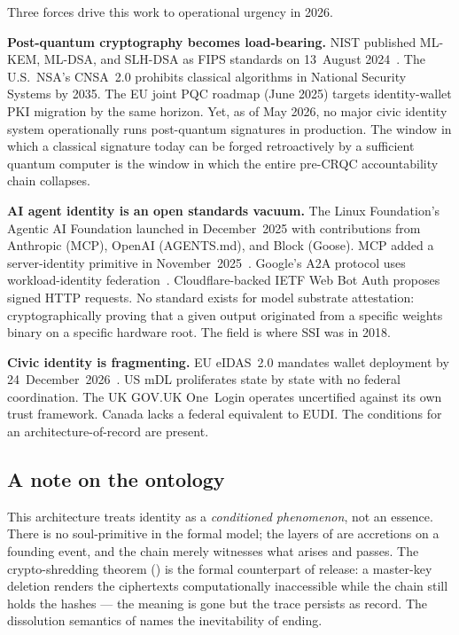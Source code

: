\documentclass[11pt,a4paper,parskip=half-,DIV=12,headings=standardclasses]{scrartcl}
\theoremstyle{ncthm}
\theoremstyle{ncdef}
\begin{document}
Three forces drive this work to operational urgency in 2026.

\textbf{Post-quantum cryptography becomes load-bearing.} NIST published
ML-KEM, ML-DSA, and SLH-DSA as FIPS standards on 13~August
2024~\cite{nist-fips-203,nist-fips-204,nist-fips-205}. The U.S.\ NSA's
CNSA~2.0 prohibits classical algorithms in National Security Systems
by 2035. The EU joint PQC roadmap (June 2025) targets identity-wallet
PKI migration by the same horizon. Yet, as of May 2026, no major civic
identity system operationally runs post-quantum signatures in
production. The window in which a classical signature today can be
forged retroactively by a sufficient quantum computer is the window
in which the entire pre-CRQC accountability chain collapses.

\textbf{AI agent identity is an open standards vacuum.} The Linux
Foundation's Agentic AI Foundation launched in December~2025 with
contributions from Anthropic (MCP), OpenAI (AGENTS.md), and Block
(Goose). MCP added a server-identity primitive in
November~2025~\cite{mcp-spec-2025-11}. Google's A2A protocol uses
workload-identity federation~\cite{google-a2a}. Cloudflare-backed
IETF Web Bot Auth proposes signed HTTP requests. No standard exists
for model substrate attestation: cryptographically proving that a
given output originated from a specific weights binary on a specific
hardware root. The field is where SSI was in 2018.

\textbf{Civic identity is fragmenting.} EU eIDAS~2.0 mandates wallet
deployment by 24~December~2026~\cite{eidas-2024-1183}. US mDL
proliferates state by state with no federal coordination. The UK
GOV.UK One~Login operates uncertified against its own trust
framework. Canada lacks a federal equivalent to EUDI. The conditions
for an architecture-of-record are present.

\subsection{A note on the ontology}

This architecture treats identity as a \emph{conditioned phenomenon},
not an essence. There is no soul-primitive in the formal model; the
layers of  are accretions on a founding event,
and the chain merely witnesses what arises and passes. The
crypto-shredding theorem () is the formal
counterpart of release: a master-key deletion renders the ciphertexts
computationally inaccessible while the chain still holds the hashes
--- the meaning is gone but the trace persists as record. The
dissolution semantics of  names the
inevitability of ending.
\end{document}
